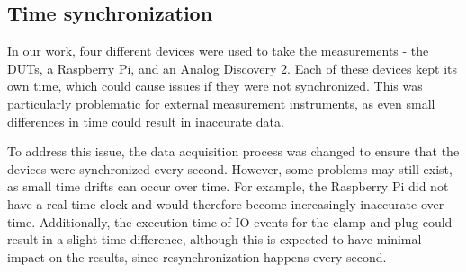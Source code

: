 \subsection{Time synchronization}
In our work, four different devices were used to take the measurements - the DUTs, a Raspberry Pi, and an Analog Discovery 2. Each of these devices kept its own time, which could cause issues if they were not synchronized. This was particularly problematic for external measurement instruments, as even small differences in time could result in inaccurate data.

To address this issue, the data acquisition process was changed to ensure that the devices were synchronized every second. However, some problems may still exist, as small time drifts can occur over time. For example, the Raspberry Pi did not have a real-time clock\cite{RTCRasp} and would therefore become increasingly inaccurate over time. Additionally, the execution time of IO events for the clamp and plug could result in a slight time difference, although this is expected to have minimal impact on the results, since resynchronization happens every second.


